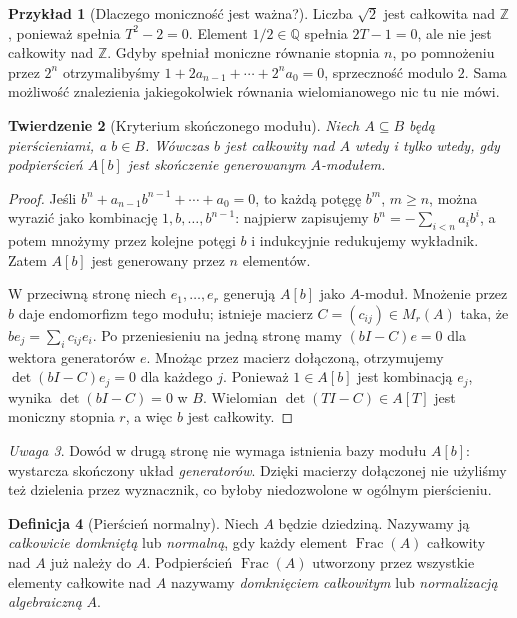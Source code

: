 \documentclass[11pt,a4paper,openany]{report}
\numberwithin{equation}{section}
\theoremstyle{plain}
\newtheorem{twierdzenie}{Twierdzenie}[section]
\theoremstyle{definition}
\newtheorem{definicja}[twierdzenie]{Definicja}
\newtheorem{przyklad}[twierdzenie]{Przykład}
\theoremstyle{remark}
\newtheorem{uwaga}[twierdzenie]{Uwaga}
\newcommand{\Z}{\mathbb Z}
\newcommand{\Q}{\mathbb Q}
\newcommand{\Frac}{\operatorname{Frac}}
\begin{document}
\begin{przyklad}[Dlaczego moniczność jest ważna?]
Liczba $\sqrt2$ jest całkowita nad $\Z$, ponieważ
spełnia $T^2-2=0$. Element $1/2\in\Q$ spełnia
$2T-1=0$, ale nie jest całkowity nad $\Z$.
Gdyby spełniał moniczne równanie stopnia $n$,
po pomnożeniu przez $2^n$ otrzymalibyśmy
$1+2a_{n-1}+\cdots+2^na_0=0$, sprzeczność
modulo $2$. Sama możliwość znalezienia jakiegokolwiek
równania wielomianowego nic tu nie mówi.
\end{przyklad}

\begin{twierdzenie}[Kryterium skończonego modułu]
\label{tw:integrality-module}
Niech $A\subseteq B$ będą pierścieniami, a $b\in B$.
Wówczas $b$ jest całkowity nad $A$ wtedy i tylko wtedy,
gdy podpierścień $A[b]$ jest skończenie generowanym
$A$-modułem.
\end{twierdzenie}
\begin{proof}
Jeśli $b^n+a_{n-1}b^{n-1}+\cdots+a_0=0$,
to każdą potęgę $b^m$, $m\ge n$, można wyrazić
jako kombinację $1,b,\ldots,b^{n-1}$: najpierw
zapisujemy $b^n=-\sum_{i<n}a_ib^i$,
a potem mnożymy przez kolejne potęgi $b$ i
indukcyjnie redukujemy wykładnik. Zatem
$A[b]$ jest generowany przez $n$ elementów.

W przeciwną stronę niech $e_1,\ldots,e_r$ generują
$A[b]$ jako $A$-moduł. Mnożenie przez $b$
daje endomorfizm tego modułu; istnieje macierz
$C=(c_{ij})\in M_r(A)$ taka, że
$b e_j=\sum_i c_{ij}e_i$. Po przeniesieniu na jedną
stronę mamy $(bI-C)e=0$ dla wektora generatorów $e$.
Mnożąc przez macierz dołączoną, otrzymujemy
$\det(bI-C)e_j=0$ dla każdego $j$. Ponieważ
$1\in A[b]$ jest kombinacją $e_j$, wynika
$\det(bI-C)=0$ w $B$. Wielomian
$\det(TI-C)\in A[T]$ jest moniczny stopnia $r$,
a więc $b$ jest całkowity.
\end{proof}

\begin{uwaga}
Dowód w drugą stronę nie wymaga istnienia bazy modułu
$A[b]$: wystarcza skończony układ \emph{generatorów}.
Dzięki macierzy dołączonej nie użyliśmy też dzielenia
przez wyznacznik, co byłoby niedozwolone w ogólnym
pierścieniu.
\end{uwaga}

\begin{definicja}[Pierścień normalny]
Niech $A$ będzie dziedziną. Nazywamy ją
\emph{całkowicie domkniętą} lub \emph{normalną},
gdy każdy element $\Frac(A)$ całkowity nad $A$
już należy do $A$. Podpierścień $\Frac(A)$
utworzony przez wszystkie elementy całkowite nad $A$
nazywamy \emph{domknięciem całkowitym} lub
\emph{normalizacją algebraiczną} $A$.
\end{definicja}
\end{document}
